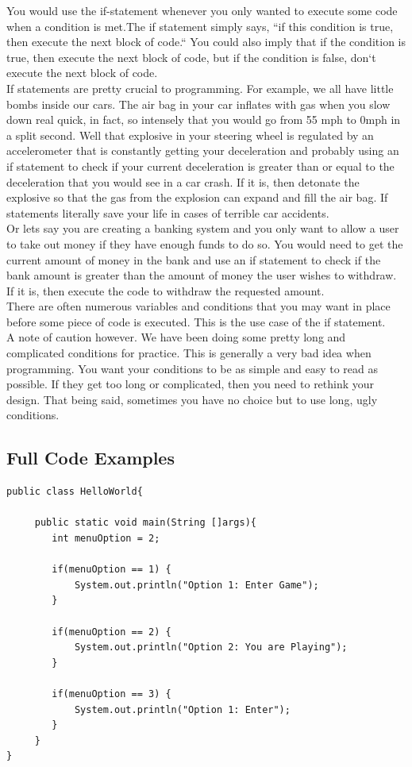 \documentclass[11]{article}
\begin{document}
You would use the if-statement whenever you only wanted to execute some code when a condition is met.The if statement simply says, ``if this condition is true, then execute the next block of code.`` You could also imply that if the condition is true, then execute the next block of code, but if the condition is false, don`t execute the next block of code.\\

If statements are pretty crucial to programming. For example, we all have little bombs inside our cars. The air bag in your car inflates with gas when you slow down real quick, in fact, so intensely that you would go from 55 mph to 0mph in a split second. Well that explosive in your steering wheel is regulated by an accelerometer that is constantly getting your deceleration and probably using an if statement to check if your current deceleration is greater than or equal to the deceleration that you would see in a car crash. If it is, then detonate the explosive so that the gas from the explosion can expand and fill the air bag. If statements literally save your life in cases of terrible car accidents.\\

Or lets say you are creating a banking system and you only want to allow a user to take out money if they have enough funds to do so. You would need to get the current amount of money in the bank and use an if statement to check if the bank amount is greater than the amount of money the user wishes to withdraw. If it is, then execute the code to withdraw the requested amount.\\

There are often numerous variables and conditions that you may want in place before some piece of code is executed. This is the use case of the if statement.\\

A note of caution however. We have been doing some pretty long and complicated conditions for practice. This is generally a very bad idea when programming. You want your conditions to be as simple and easy to read as possible. If they get too long or complicated, then you need to rethink your design. That being said, sometimes you have no choice but to use long, ugly conditions.
\subsection{Full Code Examples}
\begin{lstlisting}
public class HelloWorld{

     public static void main(String []args){
        int menuOption = 2;
         
        if(menuOption == 1) {
            System.out.println("Option 1: Enter Game");
        }
        
        if(menuOption == 2) {
            System.out.println("Option 2: You are Playing");
        }
        
        if(menuOption == 3) {
            System.out.println("Option 1: Enter");
        }        
     }
}
\end{lstlisting}
\end{document}
